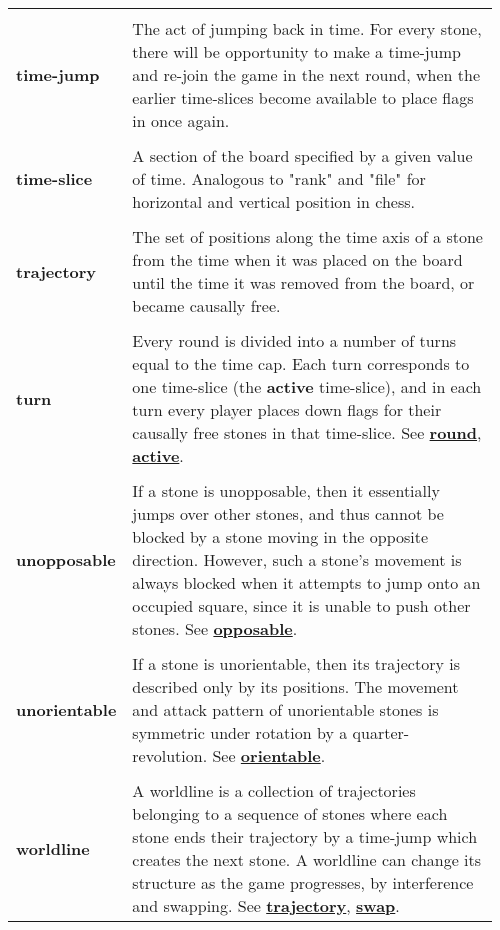 {\begin{longtable}{ R{0.15\linewidth}  L{0.81\linewidth}  }
 \\* \textbf{time-jump} & \parbox[t]{\linewidth}{The act of jumping back in time. For every stone, there will be opportunity to make a time-jump and re-join the game in the next round, when the earlier time-slices become available to place flags in once again.}\\
 \\* \textbf{time-slice} & \parbox[t]{\linewidth}{A section of the board specified by a given value of time. Analogous to "rank" and "file" for horizontal and vertical position in chess.}\\
 \\* \textbf{trajectory} & \parbox[t]{\linewidth}{The set of positions along the time axis of a stone from the time when it was placed on the board until the time it was removed from the board, or became causally free.}\\
 \\* \textbf{turn} & \parbox[t]{\linewidth}{Every round is divided into a number of turns equal to the time cap. Each turn corresponds to one time-slice (the \textbf{active} time-slice), and in each turn every player places down flags for their causally free stones in that time-slice. See \hyperref[glossary:round]{\textbf{round}}, \hyperref[glossary:active]{\textbf{active}}.}\\
 \\* \textbf{unopposable} & \parbox[t]{\linewidth}{If a stone is unopposable, then it essentially jumps over other stones, and thus cannot be blocked by a stone moving in the opposite direction. However, such a stone's movement is always blocked when it attempts to jump onto an occupied square, since it is unable to push other stones. See \hyperref[glossary:opposable]{\textbf{opposable}}.}\\
 \\* \textbf{unorientable} & \parbox[t]{\linewidth}{If a stone is unorientable, then its trajectory is described only by its positions. The movement and attack pattern of unorientable stones is symmetric under rotation by a quarter-revolution. See \hyperref[glossary:orientable]{\textbf{orientable}}.}\\
 \\* \textbf{worldline} & \parbox[t]{\linewidth}{A worldline is a collection of trajectories belonging to a sequence of stones where each stone ends their trajectory by a time-jump which creates the next stone. A worldline can change its structure as the game progresses, by interference and swapping. See \hyperref[glossary:trajectory]{\textbf{trajectory}}, \hyperref[glossary:swap]{\textbf{swap}}.}


\end{longtable}}